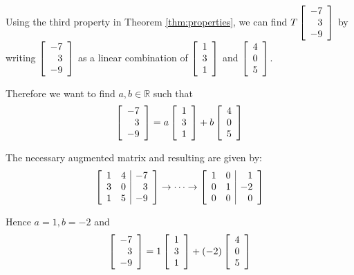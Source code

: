 \begin{solution}
Using the third property in Theorem \ref{thm:properties}, we can find $T \left[ \begin{array}{r}
-7 \\
3 \\
-9
\end{array} \right]$ by writing $\left[ \begin{array}{r}
-7 \\
3 \\
-9
\end{array} \right]$ as a linear combination of $\left[ \begin{array}{r}
1 \\
3 \\
1
\end{array} \right]$ and $\left[ \begin{array}{r}
4 \\
0 \\
5
\end{array} \right]$. 

Therefore we want to find $a,b \in \mathbb{R}$ such that 
\[
\left[ \begin{array}{r}
-7 \\
3 \\
-9
\end{array} \right]
=
a
\left[ \begin{array}{r}
1 \\
3 \\
1
\end{array} \right]
+
b
\left[ \begin{array}{r}
4 \\
0 \\
5
\end{array} \right]
\]

The necessary augmented matrix and resulting {\rref} are given by:
\[
\left[
\begin{array}{rr|r}
1 & 4 & -7 \\
3 & 0 & 3 \\
1 & 5 & -9 
\end{array}
\right]
\rightarrow \cdots \rightarrow
\left[
\begin{array}{rr|r}
1 & 0 & 1 \\
0 & 1 & -2 \\
0 & 0 & 0 
\end{array}
\right]
\]

Hence $a = 1, b = -2$ and \[
\left[ \begin{array}{r}
-7 \\
3 \\
-9
\end{array} \right]
=
1
\left[ \begin{array}{r}
1 \\
3 \\
1
\end{array} \right]
+
(-2)
\left[ \begin{array}{r}
4 \\
0 \\
5
\end{array} \right]
\]


\end{solution}
